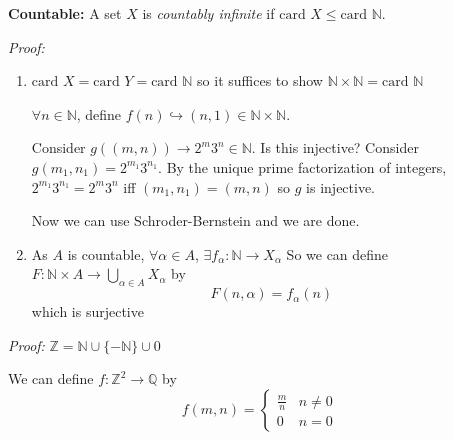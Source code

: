 \documentclass[12pt]{article}
\newcommand{\Z}{\mathbb{Z}}
\newcommand{\N}{\mathbb{N}}
\newcommand{\Q}{\mathbb{Q}}
\newcommand{\card}{\text{card }}
\newcommand{\inj}{\hookrightarrow}
\newenvironment*{tbox}[2][gray]{
    \begin{tcolorbox}[
        parbox=false,
        colback=#1!5!white,
        colframe=#1!75!black,
        breakable,
        title={#2}
    ]}
    {\end{tcolorbox}}
\begin{document}
    \textbf{Countable:} A set $X$ is \emph{countably infinite} if $\card X \leq \card \N$.

    \begin{tbox}{\textbf{Proposition:} 
        \begin{enumerate}[label=(\alph*)]
            \item If $X$ and $Y$ are countable, so is $X \times Y$.
            \item If $A$ is countable and $X_{\alpha}$ is countable for every $\alpha \in A$, then $\bigcup_{\alpha \in A} X_{\alpha}$ is countable.
        \end{enumerate}}
        \emph{Proof:} 
        \begin{enumerate}[label=(\alph*)]
            \item $\card X = \card Y =\card \N$ so it suffices to show $\N \times \N = \card \N$ 
            
            $\forall n \in \N$, define $f(n) \inj (n, 1) \in \N \times \N$.

            \color{red}
            Consider $g((m, n)) \to 2^m 3^n \in \N$. Is this injective? Consider $g(m_1, n_1) = 2^{m_1} 3^{n_1}$. By the unique prime factorization of integers, $2^{m_1} 3^{n_1} = 2^m 3^n$ iff $(m_1, n_1) = (m, n)$ so $g$ is injective.

            Now we can use Schroder-Bernstein and we are done. 

            \item As $A$ is countable, $\forall \alpha \in A$, $\exists f_{\alpha}: \N \to X_{\alpha}$ So we can define $F: \N \times A \to \bigcup_{\alpha \in A} X_{\alpha}$ by 
            \[F(n, \alpha) = f_{\alpha}(n)\]
            which is surjective 

            \color{black}

        \end{enumerate}

    \end{tbox}

    \begin{tbox}{\textbf{Corollary:} $\Z$ and $\Q$ are countable}
        \emph{Proof:} $\Z = \N \cup \{-\N\} \cup 0$ 

        We can define $f: \Z^2 \to \Q$ by 
        \[f(m, n) = \begin{cases}
            \frac{m}{n} & n \neq 0\\
            0 & n = 0 
        \end{cases}\] 
    \end{tbox}
\end{document}

